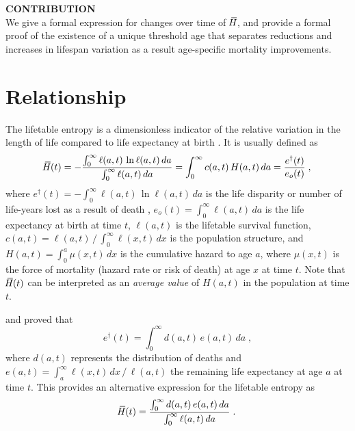 \documentclass[a4paper,twoside, openright, 12pt, leqno]{article}
\newcommand*\xbar[1]{%
   \hbox{%
     \vbox{%
       \hrule height 0.5pt %
       \kern0.3ex%
       \hbox{%
         \kern-0.28em%
         \ensuremath{#1}%
         \kern-0.05em%
       }%
     }%
   }%
}
\begin{document}
\noindent\textbf{CONTRIBUTION} \\
We give a formal expression for changes over time of $\,\xbar{H}$, and provide a formal proof of the existence of a unique threshold age that separates reductions and increases in lifespan variation as a result age-specific mortality improvements.

\linespread{2}\normalsize
\clearpage



\section{Relationship}
The lifetable entropy is a dimensionless indicator of the relative variation in the length of life compared to life expectancy at birth \citep{keyfitz1968introduction, Keyfitz1977, demetrius1974demographic, demetrius1978adaptive}. It is usually defined as
%
\begin{equation*}
\xbar{H}(t)=-\frac{\int_0^\infty\ell(a, t)\,\ln\ell(a, t)\,da}{\int_0^\infty\ell(a, t)\,da}=\int_0^\infty c(a, t)\,H(a,t)\,da=\frac{e^\dagger(t)}{e_o(t)}\;,
\end{equation*}
%
where $e^\dagger(t)=-\int_0^\infty\ell(a,t)\,\ln\ell(a,t)\,da$ is the life disparity or number of life-years lost as a result of death \citep{Vaupel2003}, $e_o(t)=\int_0^\infty\ell(a, t)\,da$ is the life expectancy at birth at time $t$, $\ell(a,t)$ is the lifetable survival function, $c(a,t)=\ell(a,t)\,/\,\int_0^\infty\ell(x,t)\,dx$ is the population structure, and $H(a,t)=\int_0^a\mu(x,t)\,dx$ is the cumulative hazard to age $a$, where $\mu(x,t)$ is the force of mortality (hazard rate or risk of death) at age $x$ at time $t$. Note that $\,\xbar{H}(t)$ can be interpreted as an \emph{average value} of $H(a,t)$ in the population at time $t$.

\cite{Goldman1986} and \cite{Vaupel1986} proved that
%
$$
e^\dagger(t)=\int_0^\infty d(a, t)\,e(a, t)\,da\;,
$$
%
where $d(a,t)$ represents the distribution of deaths and $e(a,t)=\int_a^\infty\ell(x,t)\,dx\,/\,\ell(a,t)$ the remaining life expectancy at age $a$ at time $t$. This provides an alternative expression for the lifetable entropy as
%
$$
\xbar{H}(t)=\frac{\int_0^\infty d(a, t)\,e(a, t)\,da}{\int_0^\infty\ell(a, t)\,da}\;.
$$
\end{document}
